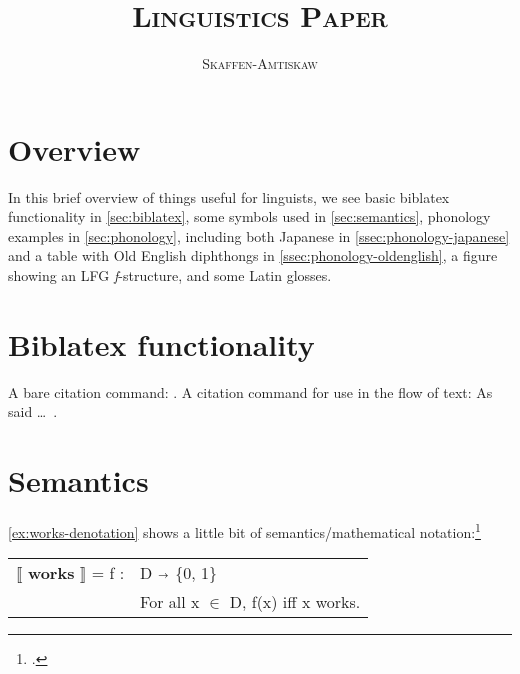 \documentclass[a4paper,12pt,twoside]{article}
\newcommand{\thistitle}{\textsc{Linguistics Paper}}
\newcommand{\thisauthor}{\textsc{Skaffen-Amtiskaw}}
\begin{document}

\tableofcontents
\thispagestyle{toc}
\newpage

\listoffigures
\thispagestyle{lof}
\newpage

\listoftables
\thispagestyle{lot}
\newpage

\title{\thistitle}
\author{\thisauthor}

\maketitle
\thispagestyle{plain}

\section{Overview}

In this brief overview of things useful for linguists, we see basic biblatex
functionality in \autoref{sec:biblatex}, some symbols used in
\autoref{sec:semantics}, phonology examples in \autoref{sec:phonology},
including both Japanese in \autoref{ssec:phonology-japanese} and a table with
Old English diphthongs in \autoref{ssec:phonology-oldenglish}, a figure showing
an LFG \textit{f}-structure, and some Latin glosses.

\section{Biblatex functionality}
\label{sec:biblatex}

A bare citation command: \autocite{burgess-plunkett-2013-1}. A citation command
for use in the flow of text: As \textcite{burgess-plunkett-2013-1} said \dots~.

\section{Semantics}
\label{sec:semantics}

\autoref{ex:works-denotation} shows a little bit of semantics/mathematical
notation:\footcite[15]{heim-kratzer-1998}

\begin{exe}
    \ex\label{ex:works-denotation}

    \leavevmode\vadjust{\vspace{-\baselineskip}}

    \begin{tabular}[c]{l l}
      $\llbracket$ \textbf{works} $\rrbracket$ = f : & D $\shortrightarrow$ \{0, 1\} \\
                                                     & For all x $\in$ D, f(x) iff x works.  \\
    \end{tabular}

\end{exe}
\end{document}
